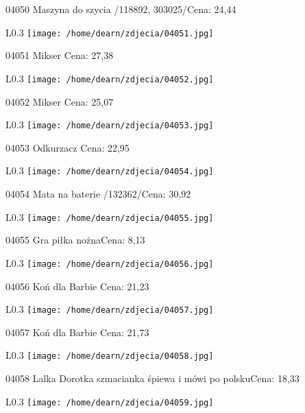 04050 Maszyna do szycia  /118892, 303025/Cena: 24,44\newline
\begin{wrapfigure}{L}{0.3\textwidth}
\texttt{[image: /home/dearn/zdjecia/04051.jpg]}
\end{wrapfigure}
04051 Mikser Cena: 27,38\newline
\begin{wrapfigure}{L}{0.3\textwidth}
\texttt{[image: /home/dearn/zdjecia/04052.jpg]}
\end{wrapfigure}
04052 Mikser Cena: 25,07\newline
\begin{wrapfigure}{L}{0.3\textwidth}
\texttt{[image: /home/dearn/zdjecia/04053.jpg]}
\end{wrapfigure}
04053 Odkurzacz Cena: 22,95\newline
\begin{wrapfigure}{L}{0.3\textwidth}
\texttt{[image: /home/dearn/zdjecia/04054.jpg]}
\end{wrapfigure}
04054 Mata na baterie /132362/Cena: 30,92\newline
\begin{wrapfigure}{L}{0.3\textwidth}
\texttt{[image: /home/dearn/zdjecia/04055.jpg]}
\end{wrapfigure}
04055 Gra piłka nożnaCena: 8,13\newline
\begin{wrapfigure}{L}{0.3\textwidth}
\texttt{[image: /home/dearn/zdjecia/04056.jpg]}
\end{wrapfigure}
04056 Koń dla Barbie Cena: 21,23\newline
\begin{wrapfigure}{L}{0.3\textwidth}
\texttt{[image: /home/dearn/zdjecia/04057.jpg]}
\end{wrapfigure}
04057 Koń dla Barbie Cena: 21,73\newline
\begin{wrapfigure}{L}{0.3\textwidth}
\texttt{[image: /home/dearn/zdjecia/04058.jpg]}
\end{wrapfigure}
04058 Lalka Dorotka szmacianka śpiewa i mówi po polskuCena: 18,33\newline
\begin{wrapfigure}{L}{0.3\textwidth}
\texttt{[image: /home/dearn/zdjecia/04059.jpg]}
\end{wrapfigure}
